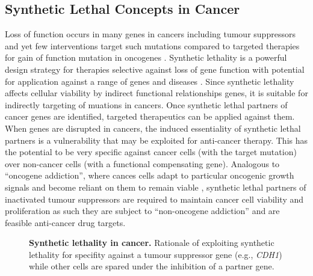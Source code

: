 \subsection{Synthetic Lethal Concepts in Cancer}

Loss of function occurs in many genes in cancers including tumour suppressors and yet few interventions target such mutations compared to targeted therapies for gain of function mutation in oncogenes \citep{Kaelin2005}. Synthetic lethality is a powerful design strategy for therapies selective against loss of gene function with potential for application against a range of genes and diseases \citep{Kaelin2009, Fece2015}. Since synthetic lethality affects cellular viability by indirect functional relationships genes, it is suitable for indirectly targeting of muations in cancers. Once synthetic lethal partners of cancer genes are identified, targeted therapeutics can be applied against them. When genes are disrupted in cancers, the induced essentiality of synthetic lethal partners is a vulnerability that may be exploited for anti-cancer therapy. This has the potential to be very specific against cancer cells (with the target mutation) over non-cancer cells (with a functional compensating gene). Analogous to ``oncogene addiction'', where cances cells adapt to particular oncogenic growth signals and become reliant on them to remain viable \citep{Luo2009, Weinstein2000}, synthetic lethal partners of inactivated tumour suppressors are required to maintain cancer cell viability and proliferation as such they are subject to ``non-oncogene addiction'' and are feasible anti-cancer drug targets. 


\begin{figure}[!ht]
\begin{mdframed}
      \caption[Synthetic lethality in cancer]{\small \textbf{Synthetic lethality in cancer.} Rationale of exploiting synthetic lethality for specifity against a tumour suppressor gene (e.g.,  \textit{CDH1}) while other cells are spared under the inhibition of a partner gene.}
\label{fig:SL_Concept}
\end{mdframed}
\end{figure}

